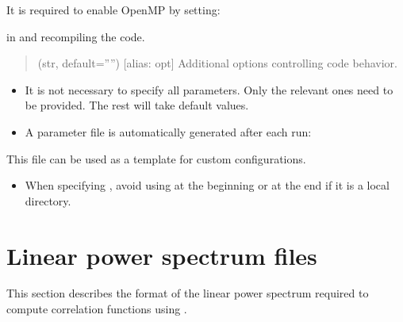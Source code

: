 \documentclass[letterpaper,10pt,english]{sphinxmanual}
\begin{document}
\sphinxAtStartPar
It is required to enable OpenMP by setting:

\begin{sphinxVerbatim}[commandchars=\\\{\}]
  
\end{sphinxVerbatim}

\sphinxAtStartPar
in  and recompiling the code.
\begin{quote}\begin{description}
\sphinxAtStartPar
(str, default=””) {[}alias: opt{]} Additional options controlling code behavior.

\end{description}\end{quote}
\begin{itemize}
\item {} 
\sphinxAtStartPar
It is not necessary to specify all parameters. Only the relevant ones need to be provided. The rest will take default values.

\item {} 
\sphinxAtStartPar
A parameter file is automatically generated after each run:

\begin{sphinxVerbatim}[commandchars=\\\{\}]
\end{sphinxVerbatim}

\end{itemize}

\sphinxAtStartPar
This file can be used as a template for custom configurations.
\begin{itemize}
\item {} 
\sphinxAtStartPar
When specifying , avoid using  at the beginning or \sphinxtitleref{/} at the end if it is a local directory.

\end{itemize}

\sphinxstepscope


\chapter{Linear power spectrum files}
\label{\detokenize{ps_files:linear-power-spectrum-files}}\label{\detokenize{ps_files::doc}}
\sphinxAtStartPar
This section describes the format of the linear power spectrum required to compute correlation functions using .
\end{document}
